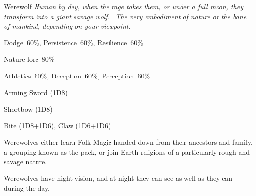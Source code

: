 \begin{monsterbox}{Werewolf}
	\textit{Human by day, when the rage takes them, or under a full moon, they transform into a giant savage wolf.  The very embodiment of nature or the bane of mankind, depending on your viewpoint.}\\
	\rpghline
	\basics[%
        hitpoints  = 12, 
	majorwound = 6,
	damagemodifier = +1D6 (wolf),
	powerpoints = 11,
	movementrate = {15m (man), 30m (wolf)},
	armor = Hide (1AP),
	plunderrating = 0
	]
	\rpghline%
	\stats[ %
		STR = 3D6/6D6  (11/22),
		CON = 3D6      (11),
		DEX = 3D6      (11),
		SIZ = 2D6+6    (13),
		INT = 2D6+6/1D6+3 (13/6),
		POW = 3D6      (11),
		CHA = 3D6      (11)
	]
	\rpghline%
	\begin{rpg-monsteraction}[Resistances]
		Dodge~60\%, Persistence~60\%, Resilience~60\%
	\end{rpg-monsteraction}
	\begin{rpg-monsteraction}[Knowledge]
    		Nature lore~80\%
	\end{rpg-monsteraction}
	\begin{rpg-monsteraction}[Practical]
		Athletics~60\%, Deception~60\%, Perception~60\%
	\end{rpg-monsteraction}
	\begin{rpg-monsteraction}
		Arming Sword (1D8)
	\end{rpg-monsteraction}
	\begin{rpg-monsteraction}
		Shortbow (1D8)
	\end{rpg-monsteraction}
	\begin{rpg-monsteraction}
		Bite (1D8+1D6), Claw (1D6+1D6)
	\end{rpg-monsteraction}
	\begin{rpg-monsteraction}[Magic]
		Werewolves either learn Folk Magic handed down from their ancestors and family, a grouping known as the pack, or join Earth religions of a particularly rough and savage nature.
	\end{rpg-monsteraction}
	\begin{rpg-monsteraction}
		Werewolves have night vision, and at night they can see as well as they can during the day.
	\end{rpg-monsteraction}

\end{monsterbox}
